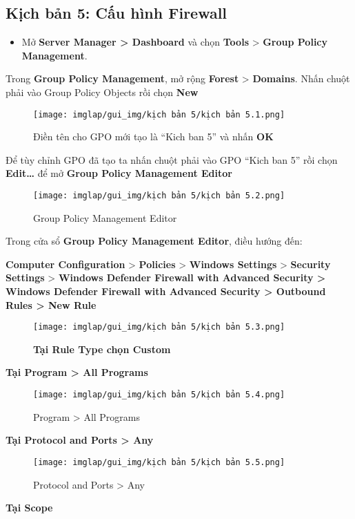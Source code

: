 \documentclass[13pt]{article}
\begin{document}
        \subsection{Kịch bản 5: Cấu hình Firewall}
        \begin{itemize}
            \item Mở \textbf{Server Manager > Dashboard} và chọn \textbf{Tools} > \textbf{Group Policy Management}.
        \end{itemize}
Trong \textbf{Group Policy Management}, mở rộng \textbf{Forest} > \textbf{Domains}. Nhấn chuột phải vào Group Policy Objects rồi chọn \textbf{New} 
\begin{figure}[H]
    \centering
    \texttt{[image: imglap/gui\_img/kịch bản 5/kịch bản 5.1.png]}
    \caption{Điền tên cho GPO mới tạo là “Kich ban 5” và nhấn \textbf{OK } }
    \label{fig:enter-label}
\end{figure}
\newpage
Để tùy chỉnh GPO đã tạo ta nhấn chuột phải vào GPO “Kich ban 5” rồi chọn \textbf{Edit… }để mở\textbf{ Group Policy Management Editor} 
\begin{figure}[H]
     \centering
     \texttt{[image: imglap/gui\_img/kịch bản 5/kịch bản 5.2.png]}
     \caption{Group Policy Management Editor}
     \label{fig:enter-label}
 \end{figure}
\newpage
  Trong cửa sổ \textbf{Group Policy Management Editor}, điều hướng đến:

\textbf{Computer Configuration} > \textbf{Policies }> \textbf{Windows Settings} > \textbf{Security Settings} >\textbf{ Windows Defender Firewall with Advanced Security > Windows Defender Firewall with Advanced Security > Outbound Rules > New Rule} 
\begin{figure}[H]
    \centering
    \texttt{[image: imglap/gui\_img/kịch bản 5/kịch bản 5.3.png]}
    \caption{\textbf{Tại Rule Type chọn Custom } }
    \label{fig:enter-label}
\end{figure}
\newpage
\textbf{Tại Program > All Programs} 
\begin{figure}[H]
    \centering
    \texttt{[image: imglap/gui\_img/kịch bản 5/kịch bản 5.4.png]}
    \caption{Program > All Programs}
    \label{fig:enter-label}
\end{figure}
\newpage
\textbf{Tại Protocol and Ports > Any} 
\begin{figure}[H]
            \centering
            \texttt{[image: imglap/gui\_img/kịch bản 5/kịch bản 5.5.png]}
            \caption{Protocol and Ports > Any}
            \label{fig:enter-label}
        \end{figure}
\newpage
        \textbf{Tại Scope } 
        
\end{document}
